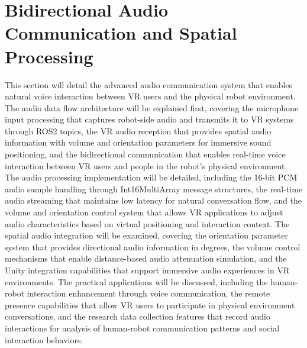 \section{Bidirectional Audio Communication and Spatial Processing}
This section will detail the advanced audio communication system that enables natural voice interaction between VR users and the physical robot environment. The audio data flow architecture will be explained first, covering the microphone input processing that captures robot-side audio and transmits it to VR systems through ROS2 topics, the VR audio reception that provides spatial audio information with volume and orientation parameters for immersive sound positioning, and the bidirectional communication that enables real-time voice interaction between VR users and people in the robot's physical environment. The audio processing implementation will be detailed, including the 16-bit PCM audio sample handling through Int16MultiArray message structures, the real-time audio streaming that maintains low latency for natural conversation flow, and the volume and orientation control system that allows VR applications to adjust audio characteristics based on virtual positioning and interaction context. The spatial audio integration will be examined, covering the orientation parameter system that provides directional audio information in degrees, the volume control mechanisms that enable distance-based audio attenuation simulation, and the Unity integration capabilities that support immersive audio experiences in VR environments. The practical applications will be discussed, including the human-robot interaction enhancement through voice communication, the remote presence capabilities that allow VR users to participate in physical environment conversations, and the research data collection features that record audio interactions for analysis of human-robot communication patterns and social interaction behaviors.

